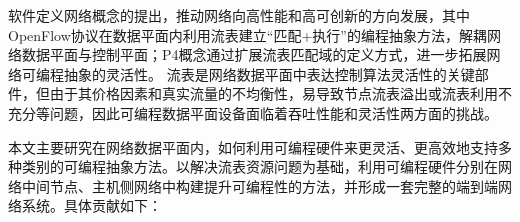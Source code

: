 
\setcounter{page}{1}

%
%
%


软件定义网络概念的提出，推动网络向高性能和高可创新的方向发展，其中OpenFlow协议在数据平面内利用流表建立“匹配+执行”的编程抽象方法，解耦网络数据平面与控制平面；P4概念通过扩展流表匹配域的定义方式，进一步拓展网络可编程抽象的灵活性。
流表是网络数据平面中表达控制算法灵活性的关键部件，但由于其价格因素和真实流量的不均衡性，易导致节点流表溢出或流表利用不充分等问题，因此可编程数据平面设备面临着吞吐性能和灵活性两方面的挑战。


本文主要研究在网络数据平面内，如何利用可编程硬件来更灵活、更高效地支持多种类别的可编程抽象方法。以解决流表资源问题为基础，利用可编程硬件分别在网络中间节点、主机侧网络中构建提升可编程性的方法，并形成一套完整的端到端网络系统。具体贡献如下：


